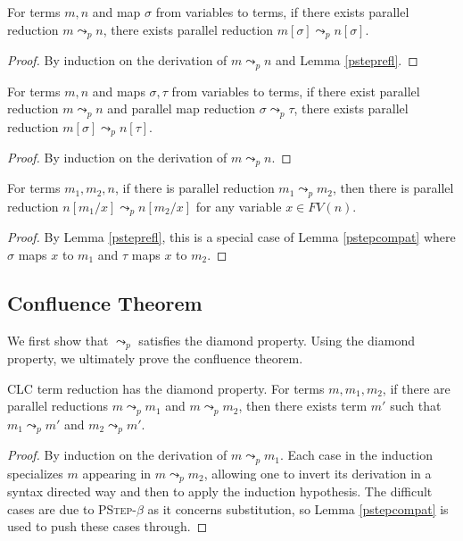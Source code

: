 \documentclass[sigplan,screen,review,anonymous]{acmart}
\newcommand{\rname}[1]{\textsc{\footnotesize #1}}
\newcommand{\pstep}{\leadsto_p}
\begin{document}
\begin{lemma}
  For terms $m, n$ and map $\sigma$ from variables to terms, if there exists parallel reduction $m \pstep n$, there exists parallel reduction $m[\sigma] \pstep n[\sigma]$.
\end{lemma}
\begin{proof}
  By induction on the derivation of $m \pstep n$ and Lemma \ref{psteprefl}.
\end{proof}

\begin{lemma}\label{pstepcompat}
  For terms $m, n$ and maps $\sigma, \tau$ from variables to terms, if there exist parallel reduction $m \pstep n$ and parallel map reduction $\sigma \pstep \tau$, there exists parallel reduction $m[\sigma] \pstep n[\tau]$.
\end{lemma}
\begin{proof}
  By induction on the derivation of $m \pstep n$.
\end{proof}

\begin{lemma}
  For terms $m_1, m_2, n$, if there is parallel reduction $m_1 \pstep m_2$, then there is parallel reduction $n[m_1/x] \pstep n[m_2/x]$ for any variable $x \in FV(n)$.
\end{lemma}
\begin{proof}
  By Lemma \ref{psteprefl}, this is a special case of Lemma \ref{pstepcompat} where $\sigma$ maps $x$ to $m_1$ and $\tau$ maps $x$ to $m_2$.
\end{proof}

\subsection{Confluence Theorem}
We first show that $\pstep$ satisfies the diamond property. Using the diamond property, we ultimately prove the confluence theorem.

\begin{lemma}\label{diamond}
  CLC term reduction has the diamond property. For terms $m, m_1, m_2$, if there are parallel reductions $m \pstep m_1$ and $m \pstep m_2$, then there exists term $m'$ such that $m_1 \pstep m'$ and $m_2 \pstep m'$.
\end{lemma}
\begin{proof}
  By induction on the derivation of $m \pstep m_1$. Each case in the induction specializes $m$ appearing in $m \pstep m_2$, allowing one to invert its derivation in a syntax directed way and then to apply the induction hypothesis. The difficult cases are due to \rname{PStep-$\beta$} as it concerns substitution, so Lemma \ref{pstepcompat} is used to push these cases through.
\end{proof}
\end{document}
